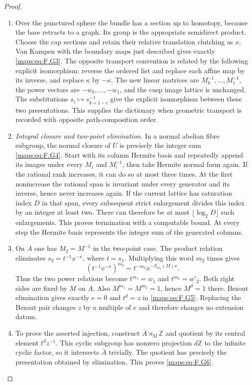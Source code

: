 \documentclass[11pt,a4paper]{article}
\numberwithin{equation}{section}
\theoremstyle{definition}
\begin{document}
\begin{proof}
\begin{enumerate}[label=\arabic*.]
\item Over the punctured sphere the bundle has a section up to homotopy,
because the base retracts to a graph.  Its group is the appropriate
semidirect product.  Choose the cap sections and retain their
relative translation clutching as $\kappa$.  Van Kampen with the
boundary maps just described gives exactly \eqref{maps:eq:F.G3}.
The opposite transport convention is related by the following explicit isomorphism:
reverse the ordered list and replace each affine map by its
inverse, and replace $\kappa$ by $-\kappa$.  The new linear
matrices are $M_k^{-1},\ldots,M_1^{-1}$, the power vectors are
$-w_k,\ldots,-w_1$, and the cusp image lattice is unchanged.
The substitutions $s_i\mapsto s_{k+1-i}^{-1}$ give the explicit
isomorphism between these two presentations.  This supplies the
dictionary when geometric transport is recorded with opposite
path-composition order.

\item \emph{Integral closure and two-point elimination.}
In a normal abelian fibre subgroup, the normal closure of $U$
is precisely the integer sum \eqref{maps:eq:F.G4}.  Start with its column
Hermite basis and repeatedly append its images under every
$M_i$ and $M_i^{-1}$, then take Hermite normal form again.
If the rational rank increases, it can do so at most three
times.  At the first nonincrease the rational span is invariant
under every generator and its inverse, hence never increases
again.  If the current lattice has saturation index $D$ in
that span, every subsequent strict enlargement divides this
index by an integer at least two.  There can therefore be at
most $\lfloor\log_2D\rfloor$ such enlargements.  This proves
termination with a computable bound. At every step the Hermite
basis represents the integer sum of the generated columns.

\item On $A$ one has $M_2=M^{-1}$ in the two-point case.  The product
relation eliminates $s_2=t^{-1}x^{-\kappa}$, where $t=s_1$.
Multiplying this word $m_2$ times gives
\[
        (t^{-1}x^{-\kappa})^{m_2}
            =t^{-m_2}x^{-S_{m_2}(M)\kappa}.
\]
Thus the two power relations become $t^{m_1}=w_1$ and
$t^{m_2}=w'_2$.  Both right sides are fixed by $M$ on $A$.
Also $M^{m_1}=M^{m_2}=1$, hence $M^d=1$ there.
Bezout elimination gives exactly $e=0$ and $t^d=z$ in
\eqref{maps:eq:F.G5}.  Replacing the Bezout pair changes $z$ by a multiple
of $e$ and therefore changes no extension datum.

\item To prove the asserted injection, construct
$\overline A\rtimes_M\mathbb Z$ and quotient by its central
element $t^dz^{-1}$.  This cyclic subgroup has nonzero
projection $d\mathbb Z$ to the infinite cyclic factor, so it
intersects $\overline A$ trivially.  The quotient has precisely
the presentation obtained by elimination.  This proves \eqref{maps:eq:F.G6}.


\end{enumerate}
\end{proof}
\end{document}
